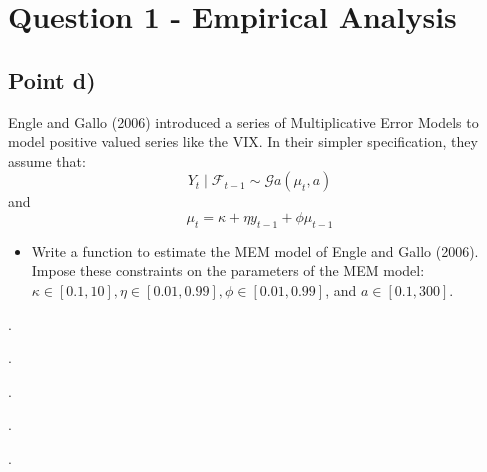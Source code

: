 \documentclass{article}
\begin{document}
\section{Question 1 - Empirical Analysis}

\subsection{Point d) }

Engle and Gallo (2006) introduced a series of Multiplicative Error
Models to model positive valued series like the VIX. In their simpler
specification, they assume that: 
\[
Y_{t}\mid\mathcal{F}_{t-1}\sim\mathcal{G}a\left(\mu_{t},a\right)
\]
 and 
\[
\mu_{t}=\kappa+\eta y_{t-1}+\phi\mu_{t-1}
\]

\begin{itemize}
\item Write a function to estimate the MEM model of Engle and Gallo (2006).
Impose these constraints on the parameters of the MEM model: $\kappa\in[0.1,10],\eta\in[0.01,0.99],\phi\in[0.01,0.99]$,
and $a\in[0.1,300]$.
\end{itemize}
.

.

.

.

.
\end{document}
